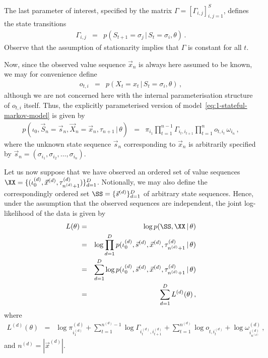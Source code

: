 \documentclass[a4paper]{article}
\begin{document}
The last parameter of interest, specified by the matrix $\Gamma=[\Gamma_{i,j}]_{i,j=1}^{S}$, defines the state transitions
\begin{eqnarray}
  \Gamma_{i,j} & = & p(S_{t+1}\!=\!\sigma_j\,|\,S_t\!=\!\sigma_i,\theta)\,.
\end{eqnarray}
Observe that the assumption of stationarity implies that $\Gamma$ is constant for all $t$.

Now, since the observed value sequence $\vec{x}_n$ is always here assumed to be known, we may for convenience define
\begin{eqnarray}
  o_{t,i} & = & p(X_t\!=\!x_t\,|\,S_t\!=\!\sigma_i,\theta)\,,
\end{eqnarray}
although we are not concerned here with the internal parameterisation structure of $o_{t,i}$ itself.
Thus, the explicitly parameterised version of model~\eqref{eq:1-stateful-markov-model} is given by
\begin{eqnarray}
  p(\iota_0,\vec{S}_n\!=\!\vec{s}_n,\vec{X}_n\!=\!\vec{x}_n,\tau_{n+1}\,|\,\theta) 
&\!\!=\!\!& 
  \pi_{i_1}\prod_{t=1}^{n-1}\Gamma_{i_t,i_{t+1}}\prod_{t=1}^{n}o_{t,i_t}\,\omega_{i_n}
\,,
\label{eq:param-markov-model}
\end{eqnarray}
where the unknown state sequence $\vec{s}_n$ corresponding to $\vec{x}_n$ is arbitrarily
specified by $\vec{s}_n=(\sigma_{i_1},\sigma_{i_2},\ldots,\sigma_{i_n})$.

Let us now suppose that we have observed an ordered set of value sequences
$\XX=\{(\iota_0^{(d)},\vec{x}^{(d)},\tau_{n^{(d)}+1}^{(d)})\}_{d=1}^{D}$.
Notionally, we may also define the correspondingly ordered set $\SS=\{\vec{s}^{(d)}\}_{d=1}^D$
of arbitrary state sequences.
Hence, under the assumption that the observed sequences are independent, the joint log-likelihood of the data is given by
\begin{eqnarray}
  L(\theta) & = & \log p(\SS,\XX\,|\,\theta) 
\nonumber\\& = & 
\log\prod_{d=1}^D 
p(\iota_0^{(d)},\vec{s}^{(d)},\vec{x}^{(d)},\tau_{n^{(d)}+1}^{(d)}\,|\,\theta) 
\nonumber\\& = & 
\sum_{d=1}^D\log 
p(\iota_0^{(d)},\vec{s}^{(d)},\vec{x}^{(d)},\tau_{n^{(d)}+1}^{(d)}\,|\,\theta) 
\nonumber\\& = & 
\sum_{d=1}^D L^{(d)}(\theta)
\,,
\end{eqnarray}
where
\begin{eqnarray}
  L^{(d)}(\theta) & = &
   \log\pi_{i_1^{(d)}}^{(d)}
 + \sum_{t=1}^{n^{(d)}-1}\log\Gamma_{i_t^{(d)},i_{t+1}^{(d)}}
 + \sum_{t=1}^{n^{(d)}}\log o_{t,i_t^{(d)}}
 + \log\omega_{i_{n^{(d)}}^{(d)}}^{(d)}
\,,
\end{eqnarray}
and $n^{(d)}=|\vec{x}^{(d)}|$.
\end{document}
